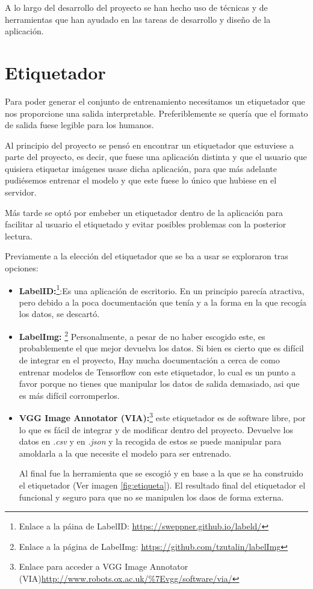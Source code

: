 \label{c.4}

A lo largo del desarrollo del proyecto se han hecho uso de técnicas y de herramientas que han ayudado en las tareas de desarrollo y diseño de la aplicación.

\section{Etiquetador}
Para poder generar el conjunto de entrenamiento necesitamos un etiquetador que nos proporcione una salida interpretable. Preferiblemente se quería que el formato de salida fuese legible para los humanos. 

Al principio del proyecto se pensó en encontrar un etiquetador que estuviese a parte del proyecto, es decir, que fuese una aplicación distinta y que el usuario que quisiera etiquetar imágenes usase dicha aplicación, para que más adelante pudiésemos entrenar el modelo y que este fuese lo único que hubiese en el servidor.

Más tarde se optó por embeber un etiquetador dentro de la aplicación para facilitar al usuario el etiquetado y evitar posibles problemas con la posterior lectura. 

Previamente a la elección del etiquetador que se ba a usar se exploraron tras opciones:

\begin{itemize}
	\item \textbf{LabelID:}\footnote{Enlace a la páina de LabelID: \url{https://sweppner.github.io/labeld/}}:Es una aplicación de escritorio. En un principio parecía atractiva, pero debido a la poca documentación que tenía y a la forma en la que recogía los datos, se descartó.

	\item \textbf{LabelImg:} \footnote{Enlace a la página de LabelImg:  \url{https://github.com/tzutalin/labelImg}} Personalmente, a pesar de no haber escogido este, es probablemente el que mejor devuelva los datos. Si bien es cierto que es difícil de integrar en el proyecto, Hay mucha documentación a cerca de como entrenar modelos de Tensorflow con este etiquetador, lo cual es un punto a favor porque no tienes que manipular los datos de salida demasiado, asi que es más difícil corromperlos.
	
	\item \textbf{VGG Image Annotator (VIA):}\footnote{Enlace para acceder a VGG Image Annotator (VIA)\url{http://www.robots.ox.ac.uk/\%7Evgg/software/via/}} este etiquetador es de software libre, por lo que es fácil de integrar y de modificar dentro del proyecto. Devuelve los datos en \textit{.csv} y en \textit{.json} y la recogida de estos se puede manipular para amoldarla a la que necesite el modelo para ser entrenado.
	
	Al final fue la herramienta que se escogió y en base a la que se ha construido el etiquetador (Ver imagen \ref{fig:etiqueta}). El resultado final del etiquetador el funcional y seguro para que no se manipulen los daos de forma externa.
	
\end{itemize}

